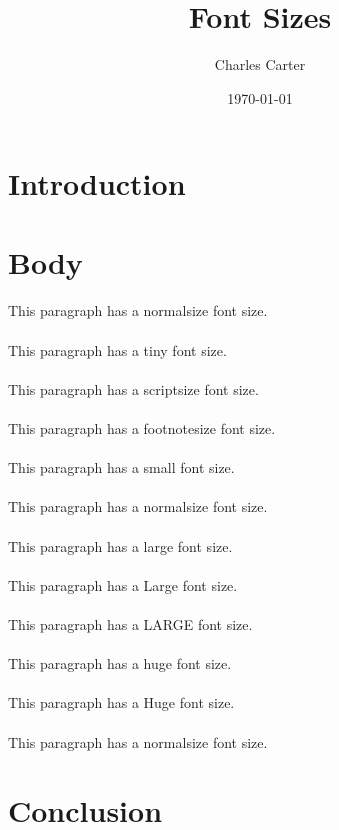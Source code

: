 \documentclass{article}
\title{Font Sizes}
\author{Charles Carter}
\date{\today{}}
\begin{document}
\maketitle{}
\section{Introduction}
\label{Introduction}
\section{Body}

\label{Body}
\normalsize{}\paragraph{}This paragraph has a normalsize font size.
\tiny{}\paragraph{}This paragraph has a tiny font size.
\scriptsize{}\paragraph{}This paragraph has a scriptsize font size.
\footnotesize{}\paragraph{}This paragraph has a footnotesize font size.
\small{}\paragraph{}This paragraph has a small font size.
\normalsize{}\paragraph{}This paragraph has a normalsize font size.
\large{}\paragraph{}This paragraph has a large font size.
\Large{}\paragraph{}This paragraph has a Large font size.
\LARGE{}\paragraph{}This paragraph has a LARGE font size.
\huge{}\paragraph{}This paragraph has a huge font size.
\Huge{}\paragraph{}This paragraph has a Huge font size.
\normalsize{}\paragraph{}This paragraph has a normalsize font size.
\section{Conclusion}
\label{Conclusion}
\end{document}
